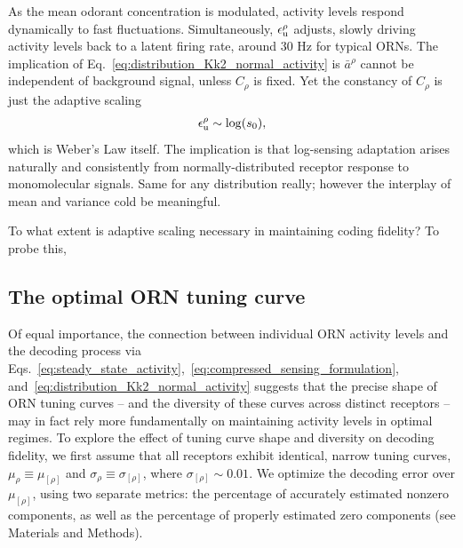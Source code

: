 \documentclass[9pt,twocolumn,twoside]{pnas-new}
\begin{document}
As the mean odorant concentration is modulated, activity levels respond dynamically to fast fluctuations. Simultaneously, $\epsilon_{\text u}^\rho$ adjusts, slowly driving activity levels back to a latent firing rate, around 30 Hz for typical ORNs. The implication of Eq.~\ref{eq:distribution_Kk2_normal_activity} is $\bar a^\rho$ cannot be independent of background signal, unless $C_\rho$ is fixed. Yet the constancy of $C_\rho$ is just the adaptive scaling
\begin{align}
\epsilon_{\text u}^\rho \sim \log(s_0),
\end{align}
which is Weber's Law itself. The implication is that log-sensing adaptation arises naturally and consistently from normally-distributed receptor response to monomolecular signals. {\color {blue} Same for any distribution really; however the interplay of mean and variance cold be meaningful.}

To what extent is adaptive scaling necessary in maintaining coding fidelity? To probe this, 

\subsection*{The optimal ORN tuning curve}

Of equal importance, the connection between individual ORN activity levels and the decoding process via Eqs.~\ref{eq:steady_state_activity},~\ref{eq:compressed_sensing_formulation}, and~\ref{eq:distribution_Kk2_normal_activity} suggests that the precise shape of ORN tuning curves -- and the diversity of these curves across distinct receptors -- may in fact rely more fundamentally on maintaining activity levels in optimal regimes. To explore the effect of tuning curve shape and diversity on decoding fidelity, we first assume that all receptors exhibit identical, narrow tuning curves, $\mu_\rho \equiv \mu_{[\rho]}$ and $\sigma_\rho \equiv \sigma_{[\rho]}$, where $\sigma_{[\rho]}\sim 0.01$. We optimize the decoding error over $\mu_{[\rho]}$, using two separate metrics: the percentage of accurately estimated nonzero components, as well as the percentage of properly estimated zero components (see Materials and Methods). 


\end{document}
